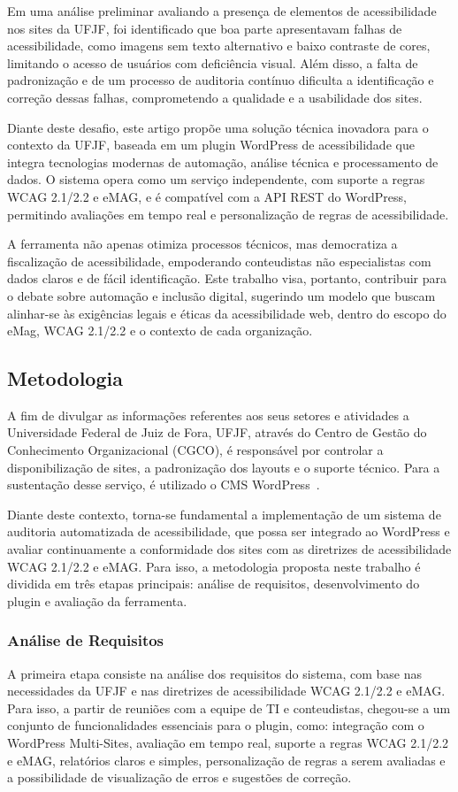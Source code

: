 \documentclass[article,12pt,oneside,a4paper,hyphens]{abntex2}
\begin{document}
Em uma análise preliminar avaliando a presença de elementos de acessibilidade nos
sites da UFJF, foi identificado que boa parte apresentavam falhas de acessibilidade, como imagens sem texto
alternativo e baixo contraste de cores, limitando o acesso de usuários com deficiência
visual. Além disso, a falta de padronização e de um processo de auditoria contínuo
dificulta a identificação e correção dessas falhas, comprometendo a qualidade e a
usabilidade dos sites.

Diante deste desafio, este artigo propõe uma solução técnica inovadora para o contexto
da UFJF, baseada em um plugin WordPress de acessibilidade que integra tecnologias
modernas de automação, análise técnica e processamento de dados. O sistema opera
como um serviço independente, com suporte a regras WCAG 2.1/2.2 e eMAG, e é
compatível com a API REST do WordPress, permitindo avaliações em tempo real e
personalização de regras de acessibilidade.

A ferramenta não apenas otimiza processos técnicos, mas democratiza 
a fiscalização de acessibilidade, empoderando conteudistas não especialistas 
com dados claros e de fácil identificação. Este trabalho visa, portanto, contribuir
para o debate sobre automação e inclusão digital, sugerindo um modelo que buscam alinhar-se às exigências legais e éticas da
acessibilidade web, dentro do escopo do eMag, WCAG 2.1/2.2 e o contexto de cada
organização.

\subsection{Metodologia}\label{subsec:metodologia}
A fim de divulgar as informações referentes aos seus setores e atividades a 
Universidade Federal de Juiz de Fora, UFJF, através do Centro de Gestão 
do Conhecimento Organizacional (CGCO), é responsável por controlar a 
disponibilização de sites, a padronização dos layouts e o suporte técnico. Para
a sustentação desse serviço, é utilizado o CMS WordPress~\autocite{WP}.

Diante deste contexto, torna-se fundamental a implementação de um sistema de
auditoria automatizada de acessibilidade, que possa ser integrado ao WordPress e
avaliar continuamente a conformidade dos sites com as diretrizes de acessibilidade
WCAG 2.1/2.2 e eMAG\@. Para isso, a metodologia proposta neste trabalho é dividida
em três etapas principais: análise de requisitos, desenvolvimento do plugin e
avaliação da ferramenta.

\subsubsection{Análise de Requisitos}
A primeira etapa consiste na análise dos requisitos do sistema, com base nas
necessidades da UFJF e nas diretrizes de acessibilidade WCAG 2.1/2.2 e 
eMAG\@. Para isso, a partir de reuniões com a equipe de TI e conteudistas, 
chegou-se a um conjunto de funcionalidades essenciais para o plugin, como: 
integração com o WordPress Multi-Sites, avaliação em tempo real, suporte a 
regras WCAG 2.1/2.2 e eMAG, relatórios claros e simples, personalização de 
regras a serem avaliadas e a possibilidade de visualização de erros e sugestões 
de correção.
\end{document}
